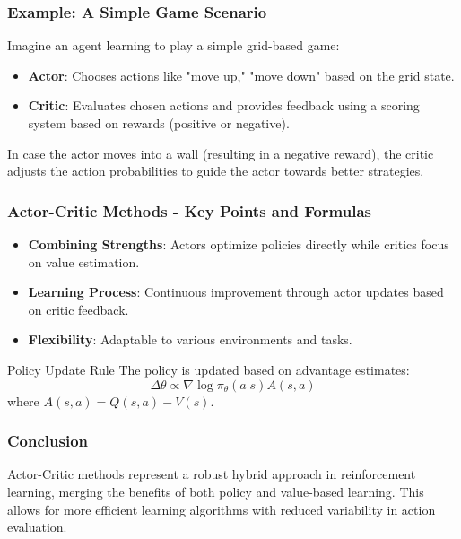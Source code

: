 \documentclass[aspectratio=169]{beamer}
\begin{document}
\begin{frame}[fragile]
    \frametitle{Example: A Simple Game Scenario}
    Imagine an agent learning to play a simple grid-based game:
    \begin{itemize}
        \item \textbf{Actor}: Chooses actions like "move up," "move down" based on the grid state.
        \item \textbf{Critic}: Evaluates chosen actions and provides feedback using a scoring system based on rewards (positive or negative).
    \end{itemize}
    In case the actor moves into a wall (resulting in a negative reward), the critic adjusts the action probabilities to guide the actor towards better strategies.
\end{frame}

\begin{frame}[fragile]
    \frametitle{Actor-Critic Methods - Key Points and Formulas}
    \begin{itemize}
        \item \textbf{Combining Strengths}: Actors optimize policies directly while critics focus on value estimation.
        \item \textbf{Learning Process}: Continuous improvement through actor updates based on critic feedback.
        \item \textbf{Flexibility}: Adaptable to various environments and tasks.
    \end{itemize}

    \begin{block}{Policy Update Rule}
        The policy is updated based on advantage estimates:
        \begin{equation}
            \Delta \theta \propto \nabla \log \pi_\theta(a|s) A(s, a)
        \end{equation}
        where \( A(s, a) = Q(s, a) - V(s) \).
    \end{block}
\end{frame}

\begin{frame}[fragile]
    \frametitle{Conclusion}
    Actor-Critic methods represent a robust hybrid approach in reinforcement learning, merging the benefits of both policy and value-based learning. This allows for more efficient learning algorithms with reduced variability in action evaluation.
\end{frame}
\end{document}
